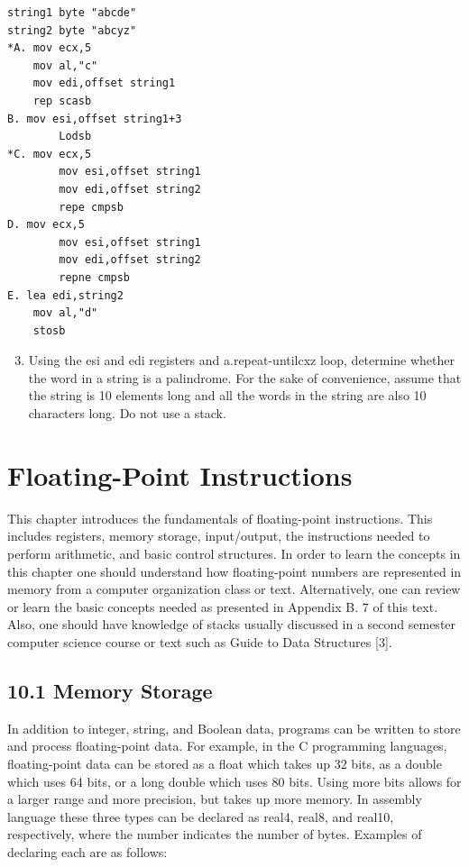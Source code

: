 \documentclass[10pt]{book}
\begin{document}
\begin{verbatim}
string1 byte "abcde"
string2 byte "abcyz"
*A. mov ecx,5
    mov al,"c"
    mov edi,offset string1
    rep scasb
B. mov esi,offset string1+3
        Lodsb
*C. mov ecx,5
        mov esi,offset string1
        mov edi,offset string2
        repe cmpsb
D. mov ecx,5
        mov esi,offset string1
        mov edi,offset string2
        repne cmpsb
E. lea edi,string2
    mov al,"d"
    stosb
\end{verbatim}

\begin{enumerate}
  \setcounter{enumi}{2}
  \item Using the esi and edi registers and a.repeat-untilcxz loop, determine whether the word in a string is a palindrome. For the sake of convenience, assume that the string is 10 elements long and all the words in the string are also 10 characters long. Do not use a stack.
\end{enumerate}


\section*{Floating-Point Instructions}
This chapter introduces the fundamentals of floating-point instructions. This includes registers, memory storage, input/output, the instructions needed to perform arithmetic, and basic control structures. In order to learn the concepts in this chapter one should understand how floating-point numbers are represented in memory from a computer organization class or text. Alternatively, one can review or learn the basic concepts needed as presented in Appendix B. 7 of this text. Also, one should have knowledge of stacks usually discussed in a second semester computer science course or text such as Guide to Data Structures [3].


\subsection*{10.1 Memory Storage}
In addition to integer, string, and Boolean data, programs can be written to store and process floating-point data. For example, in the C programming languages, floating-point data can be stored as a float which takes up 32 bits, as a double which uses 64 bits, or a long double which uses 80 bits. Using more bits allows for a larger range and more precision, but takes up more memory. In assembly language these three types can be declared as real4, real8, and real10, respectively, where the number indicates the number of bytes. Examples of declaring each are as follows:
\end{document}
